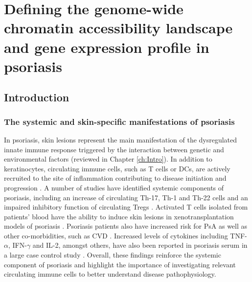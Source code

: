 \chapter{Defining the genome-wide chromatin accessibility landscape and gene expression profile in psoriasis}
\label{ch:Results2}


\section{Introduction}

\subsection{The systemic and skin-specific manifestations of psoriasis}

In psoriasis, skin lesions represent the main manifestation of the dysregulated innate immune response triggered by the interaction between genetic and environmental factors (reviewed in Chapter \ref{ch:Intro}). In addition to keratinocytes, circulating immune cells, such as T cells or DCs, are actively recruited to the site of inflammation contributing to disease initiation and progression \parencite{Johnson-Huang2009}. A number of studies have identified systemic components of psoriasis, including an increase of circulating Th-17, Th-1 and Th-22 cells and an impaired inhibitory function of circulating Tregs \parencite{Kagami2010,Sugiyama2005}. Activated T cells isolated from patients' blood have the ability to induce skin lesions in xenotransplantation models of psoriasis \parencite{Wrone-Smith1996,Nickoloff1999}. Psoriasis patients also have increased risk for PsA as well as other co-morbidities, such as CVD \parencite{Ibrahim2009,Shapiro2007}. Increased levels of cytokines including TNF-$\alpha$, IFN-$\gamma$ and IL-2, amongst others, have also been reported in psoriasis serum in a large case control study \parencite{Bai2018}. Overall, these findings reinforce the systemic component of psoriasis and highlight the importance of investigating relevant circulating immune cells to better understand disease pathophysiology.



